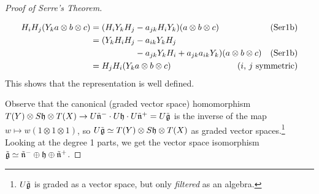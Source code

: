 \begin{proof}[Proof of Serre's Theorem]{\ }
\begin{exercise}
\begin{solution}
\begin{align*}
          H_iH_j(Y_ka\otimes b\otimes c)&= (H_iY_kH_j - a_{jk}H_iY_k)(a\otimes b\otimes
                    c) & \text{(Ser1b)}\\
                &= (Y_kH_iH_j - a_{ik}Y_kH_j \\
                &\phantom{= (H_iY_kH_j }\; - a_{jk}Y_kH_i +
                    a_{jk}a_{ik}Y_k)(a\otimes b\otimes c) &\text{(Ser1b)}\\
                &= H_jH_i(Y_ka\otimes b \otimes c) &\llap{($i$, $j$ symmetric)}
        \end{align*}
        This shows that the representation is well defined.
      \end{solution}
    \end{exercise}
    Observe that the canonical (graded vector space) homomorphism $T(Y)\otimes
    S\mathfrak{h}\otimes T(X)\to U\tilde{\mathfrak{n}}^-\cdot U\mathfrak{h}\cdot U\tilde{\mathfrak{n}}^+ = U\tilde {\mathfrak{g}}$ is the
    inverse of the map $w\mapsto w(1\otimes 1\otimes 1)$, so $U\tilde{\mathfrak{g}} \simeq
    T(Y)\otimes S\mathfrak{h}\otimes T(X)$ as graded vector spaces.\footnote{$U\tilde{\mathfrak{g}}$ is
    graded as a vector space, but only \emph{filtered} as an algebra.} Looking at the
    degree 1 parts, we get the vector space isomorphism
    $\tilde{\mathfrak{g}}\simeq\tilde{\mathfrak{n}}^-\oplus \mathfrak{h}\oplus\tilde{\mathfrak{n}}^+$.


\end{proof}
